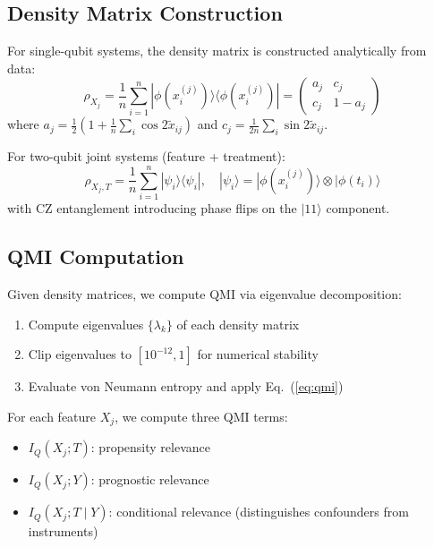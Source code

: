 \documentclass{svproc}
\newcommand{\QMI}{I_Q}
\begin{document}
\subsection{Density Matrix Construction}
\label{subsec:density}

For single-qubit systems, the density matrix is constructed analytically from data:
\begin{equation}
    \rho_{X_j} = \frac{1}{n}\sum_{i=1}^n |\phi(x_i^{(j)})\rangle\langle\phi(x_i^{(j)})| = \begin{pmatrix} a_j & c_j \\ c_j & 1-a_j \end{pmatrix}
\end{equation}
where $a_j = \frac{1}{2}(1 + \frac{1}{n}\sum_i \cos 2\tilde{x}_{ij})$ and $c_j = \frac{1}{2n}\sum_i \sin 2\tilde{x}_{ij}$.

For two-qubit joint systems (feature + treatment):
\begin{equation}
    \rho_{X_j,T} = \frac{1}{n}\sum_{i=1}^n |\psi_i\rangle\langle\psi_i|, \quad |\psi_i\rangle = |\phi(x_i^{(j)})\rangle \otimes |\phi(t_i)\rangle
\end{equation}
with CZ entanglement introducing phase flips on the $|11\rangle$ component.

\subsection{QMI Computation}
\label{subsec:qmi_compute}

Given density matrices, we compute QMI via eigenvalue decomposition:
\begin{enumerate}
    \item Compute eigenvalues $\{\lambda_k\}$ of each density matrix
    \item Clip eigenvalues to $[10^{-12}, 1]$ for numerical stability
    \item Evaluate von Neumann entropy and apply Eq.~(\ref{eq:qmi})
\end{enumerate}

For each feature $X_j$, we compute three QMI terms:
\begin{itemize}
    \item $\QMI(X_j; T)$: propensity relevance
    \item $\QMI(X_j; Y)$: prognostic relevance
    \item $\QMI(X_j; T \mid Y)$: conditional relevance (distinguishes confounders from instruments)
\end{itemize}
\end{document}
